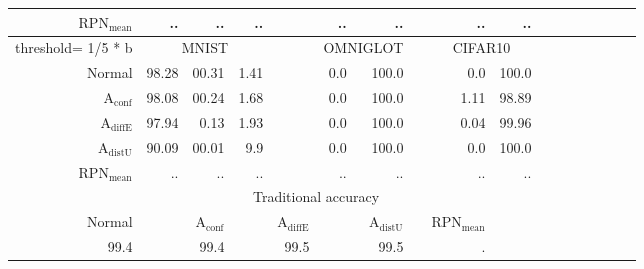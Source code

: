 \begin{table}[ht]
\begin{tiny}
\begin{tabular}{@{}rrrrrrrcrrrrcrrrr@{}}
		$\mathrm{RPN}_{\mathrm{mean}}$ & .. & .. & .. & & .. & .. & & .. & .. \\
		\midrule
		threshold= 1/5 * b & \multicolumn{3}{c}{MNIST} & & \multicolumn{2}{c}{OMNIGLOT} & & \multicolumn{2}{c}{CIFAR10} \\
		Normal & 98.28 & 00.31 & 1.41 & & 0.0 & 100.0 && 0.0 & 100.0 \\
		$\mathrm{A}_{\mathrm{conf}}$ & 98.08 & 00.24 & 1.68 && 0.0 & 100.0 && 1.11 & 98.89 \\
		$\mathrm{A}_{\mathrm{diffE}}$ & 97.94 & 0.13 & 1.93 & & 0.0 & 100.0 & & 0.04 & 99.96 \\  
		$\mathrm{A}_{\mathrm{distU}}$ & 90.09 & 00.01 & 9.9 & & 0.0 & 100.0 & & 0.0 & 100.0 \\
		$\mathrm{RPN}_{\mathrm{mean}}$ & .. & .. & .. & & .. & .. & & .. & .. \\
		\midrule
		\toprule
		& \multicolumn{8}{c}{Traditional accuracy} \\
		Normal & & $\mathrm{A}_{\mathrm{conf}}$ & & $\mathrm{A}_{\mathrm{diffE}}$ & & $\mathrm{A}_{\mathrm{distU}}$ & & $\mathrm{RPN}_{\mathrm{mean}}$ \\
		99.4 & & 99.4 & & 99.5 & & 99.5 & & . \\

        \end{tabular}
	\end{tiny}
	\label{tab:precision based data analysis}
\end{table}





